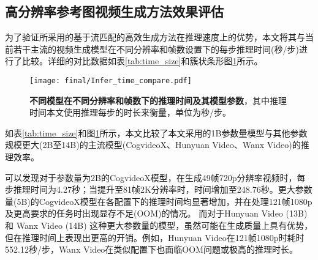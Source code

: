 \subsection{高分辨率参考图视频生成方法效果评估} %
为了验证所采用的基于流匹配的高效生成方法在推理速度上的优势，本文将其与当前若干主流的视频生成模型在不同分辨率和帧数设置下的每步推理时间(秒/步)进行了比较。详细的对比数据如表\ref{tab:time_size}和簇状条形图\ref{fig:time_size}所示。
\begin{table}[htbp]
    \centering
    \caption{不同模型参数量及在不同分辨率和帧数下的推理时间(秒/步)对比}
    \label{tab:time_size}
\end{table}
\begin{figure}[htbp]
    \centering
    \texttt{[image: final/Infer\_time\_compare.pdf]}
    \caption{\textbf{不同模型在不同分辨率和帧数下的推理时间及其模型参数}，其中推理时间本文使用推理每步的时长来衡量，单位为秒/步。
    }
    \label{fig:time_size}
\end{figure}
如表\ref{tab:time_size}和图\ref{fig:time_size}所示，本文比较了本文采用的1B参数量模型与其他参数规模更大(2B至14B)的主流模型(CogvideoX、Hunyuan Video、Wanx Video)的推理效率。

可以发现对于参数量为2B的CogvideoX模型，在生成49帧720p分辨率视频时，每步推理时间为4.27秒；当提升至81帧2K分辨率时，时间增加至248.76秒。更大参数量(5B)的CogvideoX模型在各配置下的推理时间均显著增加，并在处理121帧1080p及更高要求的任务时出现显存不足(OOM)的情况。
而对于Hunyuan Video (13B) 和 Wanx Video (14B) 这种更大参数量的模型，虽然可能在生成质量上具有优势，但在推理时间上表现出更高的开销。例如，Hunyuan Video在121帧1080p时耗时552.12秒/步，Wanx Video在类似配置下也面临OOM问题或极高的推理时长。


